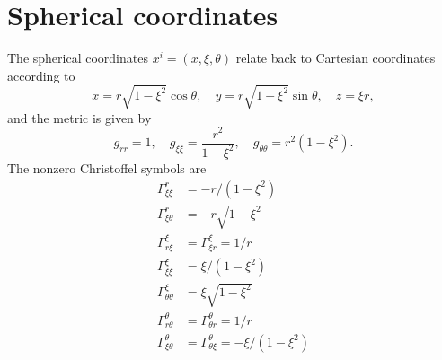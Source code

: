 \documentclass[reprint]{revtex4}
\begin{document}
\section{Spherical coordinates}
 The spherical coordinates $x^i=(x,\xi,\theta)$ relate back to Cartesian coordinates according to 
\begin{equation}
 x=r\sqrt{1-\xi^2}\cos\theta,\quad y=r\sqrt{1-\xi^2}\sin\theta,\quad z=\xi r,
\end{equation}
and the metric is given by
\begin{equation}
g_{rr}=1,\quad g_{\xi\xi}=\frac{r^2}{1-\xi^2},\quad g_{\theta\theta}=r^2\left(1-\xi^2\right).
\end{equation}
The nonzero Christoffel symbols are
\begin{align}
\Gamma^r_{\xi\xi}&=-r/(1-\xi^2)\\
\Gamma^r_{\xi\theta}&=-r\sqrt{1-\xi^2}\\
\Gamma^{\xi}_{r\xi}&=\Gamma^{\xi}_{\xi r}=1/r\\
\Gamma^{\xi}_{\xi\xi}&=\xi/(1-\xi^2)\\
\Gamma^{\xi}_{\theta\theta}&=\xi\sqrt{1-\xi^2}\\
\Gamma^{\theta}_{r\theta}&=\Gamma^{\theta}_{\theta r}=1/r\\
\Gamma^{\theta}_{\xi\theta}&=\Gamma^{\theta}_{\theta \xi}=-\xi/(1-\xi^2)
\end{align}



\end{document}

